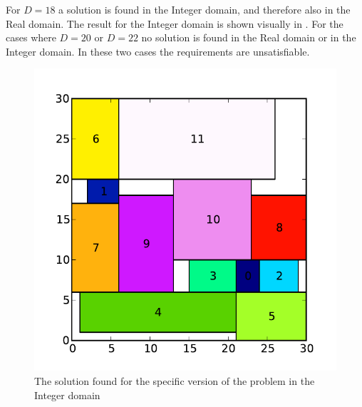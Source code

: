 For $D=18$ a solution is found in the Integer domain, and therefore also in the Real domain. The result for the Integer domain is shown visually in . For the cases where $D = 20$ or $D = 22$ no solution is found in the Real domain or in the Integer domain. In these two cases the requirements are unsatisfiable.
\begin{figure}[!ht]
  \centering
  \includegraphics[width=\columnwidth]{2/chip_layout.pdf}
  \caption{The solution found for the specific version of the problem in the Integer domain}
  \label{fig:2_result}
\end{figure}
